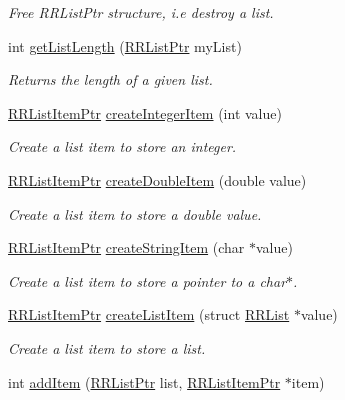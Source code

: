 \begin{DoxyCompactItemize}
\begin{DoxyCompactList}\small\item\em Free R\-R\-List\-Ptr structure, i.\-e destroy a list. \end{DoxyCompactList}\item 
int \hyperlink{group__list_ga4e64dc563715bec1bc7f026ac3daeca0}{get\-List\-Length} (\hyperlink{rrc__types_8h_a32a8a60ac06858ff3a791672bd2bec73}{R\-R\-List\-Ptr} my\-List)
\begin{DoxyCompactList}\small\item\em Returns the length of a given list. \end{DoxyCompactList}\item 
\hyperlink{rrc__types_8h_a79938364b69256c42480bb3a29ebf73e}{R\-R\-List\-Item\-Ptr} \hyperlink{group__list_ga1e385c28b44b23310db9811df2ba65ca}{create\-Integer\-Item} (int value)
\begin{DoxyCompactList}\small\item\em Create a list item to store an integer. \end{DoxyCompactList}\item 
\hyperlink{rrc__types_8h_a79938364b69256c42480bb3a29ebf73e}{R\-R\-List\-Item\-Ptr} \hyperlink{group__list_gaa61ed635b56855236a98505603f0f555}{create\-Double\-Item} (double value)
\begin{DoxyCompactList}\small\item\em Create a list item to store a double value. \end{DoxyCompactList}\item 
\hyperlink{rrc__types_8h_a79938364b69256c42480bb3a29ebf73e}{R\-R\-List\-Item\-Ptr} \hyperlink{group__list_ga1e1d689f107c91c0d300f0ea9a4cd018}{create\-String\-Item} (char $\ast$value)
\begin{DoxyCompactList}\small\item\em Create a list item to store a pointer to a char$\ast$. \end{DoxyCompactList}\item 
\hyperlink{rrc__types_8h_a79938364b69256c42480bb3a29ebf73e}{R\-R\-List\-Item\-Ptr} \hyperlink{group__list_ga829d2f599093a059c771dc49b0034ac1}{create\-List\-Item} (struct \hyperlink{struct_r_r_list}{R\-R\-List} $\ast$value)
\begin{DoxyCompactList}\small\item\em Create a list item to store a list. \end{DoxyCompactList}\item 
int \hyperlink{group__list_ga62b890cf2f2b2eccb767e86f9c302e61}{add\-Item} (\hyperlink{rrc__types_8h_a32a8a60ac06858ff3a791672bd2bec73}{R\-R\-List\-Ptr} list, \hyperlink{rrc__types_8h_a79938364b69256c42480bb3a29ebf73e}{R\-R\-List\-Item\-Ptr} $\ast$item)

\end{DoxyCompactItemize}
